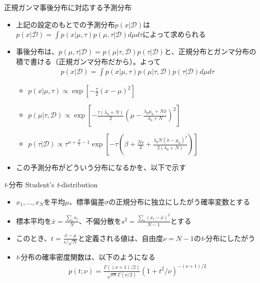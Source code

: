 \documentclass[aspectratio=169,unicode,dvipdfmx,14pt]{beamer}
\begin{document}
\begin{frame}{正規ガンマ事後分布に対応する予測分布}
\begin{itemize}
\item 上記の設定のもとでの予測分布$p(x | \mathcal{D})$は
$p(x|\mathcal{D}) = \int p(x|\mu,\tau)p(\mu,\tau|\mathcal{D}) d\mu d\tau$によって求められる
\item 事後分布は、$p(\mu,\tau|\mathcal{D})=p(\mu|\tau,\mathcal{D})p(\tau|\mathcal{D})$と、正規分布とガンマ分布の積で書ける（正規ガンマ分布だから）。よって
\begin{align}
p(x|\mathcal{D}) = \int p(x|\mu,\tau)p(\mu|\tau,\mathcal{D})p(\tau|\mathcal{D}) d\mu d\tau
\end{align}
\vspace{-.2in}
\begin{itemize}
\item $p(x|\mu,\tau) \propto \exp[ - \frac{\tau}{2} (x - \mu)^2 ]$
\item $p(\mu|\tau,\mathcal{D}) \propto \exp [ - \frac{\tau( \lambda_0 + N )}{2}  ( \mu - \frac{ \lambda_0 \mu_0 + N\bar{x} }{ \lambda_0 + N } )^2 ]$
\item $p(\tau|\mathcal{D}) \propto \tau^{\alpha + \frac{N}{2} - 1}
\exp [ - \tau ( \beta + \frac{Ns}{2} + \frac{ \lambda_0 N (\bar{x} - \mu_0)^2 }{ 2( \lambda_0 + N ) } ) ]$
\end{itemize}
\item この予測分布がどういう分布になるかを、以下で示す
\end{itemize}
\end{frame}

\begin{frame}{\textit{t}-分布 Student's \textit{t}-distribution}
\begin{itemize}
\item $x_1,\ldots,x_N$を平均$\mu$、標準偏差$\sigma$の正規分布に独立にしたがう確率変数とする
\item 標本平均を$\bar{x}=\frac{\sum_i x_i}{N}$、不偏分散を$s^2=\frac{\sum_i (x_i - \bar{x})^2}{N-1}$とする
\item このとき、$t = \frac{\bar{x} - \mu}{s / \sqrt{N}}$と定義される値は、自由度$\nu=N-1$の\textit{t}-分布にしたがう
\item \textit{t}-分布の確率密度関数は、以下のようになる
\begin{align}
p(t;\nu) = \frac{\Gamma((\nu+1)/2)}{\sqrt{\nu\pi}\Gamma(\nu/2)}(1 + t^2/\nu)^{-(\nu+1)/2}
\end{align}
\end{itemize}
\end{frame}
\end{document}
